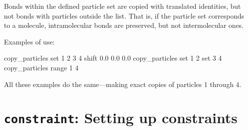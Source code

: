 Bonds within the defined particle set are copied with translated identities,
but not bonds with particles outside the list. That is, if the
particle set corresponds to a molecule, intramolecular bonds are
preserved, but not intermolecular ones.

Examples of use:\\
\begin{tclcode}
  copy_particles set {1 2 3 4} shift 0.0 0.0 0.0
  copy_particles set {1 2} set {3 4}
  copy_particles range 1 4
\end{tclcode}
All these examples do the same---making exact copies of particles 1 through 4.

\noindent
{}

\section{\texttt{constraint}: Setting up constraints}\label{sec:constraint}

